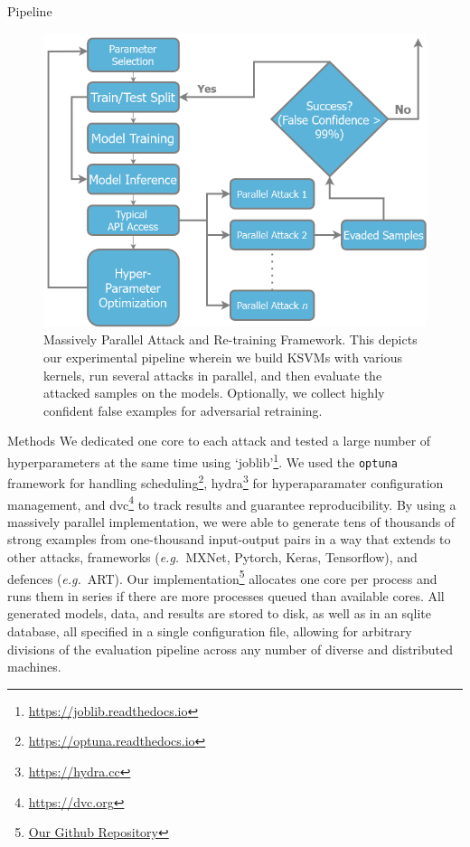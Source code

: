 \documentclass{beamer}
\begin{document}
\begin{frame}{Pipeline}
  \begin{figure}
\centering
\includegraphics[width=\textwidth]{ppgd.png}

\label{fig:attack_framework}
\caption{Massively Parallel Attack and Re-training Framework.  This depicts our experimental pipeline wherein we build KSVMs with various kernels, run several attacks in parallel, and then evaluate the attacked samples on the models. Optionally, we collect highly confident false examples for adversarial retraining.}
\end{figure}
\end{frame}

\begin{frame}{Methods}
\small
We dedicated one core to each attack and tested a large number of hyperparameters at the same time using `joblib'\footnote{\href{https://joblib.readthedocs.io}{https://joblib.readthedocs.io}}. We used the \texttt{optuna}~\cite{optuna} framework for handling scheduling\footnote{\href{https://optuna.readthedocs.io}{https://optuna.readthedocs.io}}, hydra\footnote{\href{https://hydra.cc}{https://hydra.cc}} for hyperaparamater configuration management, and dvc\footnote{\href{https://dvc.org}{https://dvc.org}} to track results and guarantee reproducibility.
  By using a massively parallel \cite{optuna} implementation, we were able to generate tens of thousands of strong examples from one-thousand input-output pairs in a way that extends to other attacks, frameworks (\textit{e.g.}~MXNet, Pytorch, Keras, Tensorflow), and defences (\textit{e.g.}~ART). Our implementation\footnote{\href{https://github.com/simplymathematics/deckard}{Our Github Repository}} allocates one core per process and runs them in series if there are more processes queued than available cores. All generated models, data, and results are stored to disk, as well as in an sqlite database, all specified in a single configuration file, allowing for arbitrary divisions of the evaluation pipeline across any number of diverse and distributed machines.
\end{frame}
\end{document}
